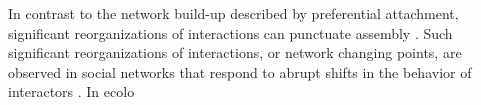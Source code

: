 \documentclass[12pt]{article}
\begin{document}
In contrast to the network build-up described by preferential
attachment, significant reorganizations of interactions can punctuate
assembly \citep{peel2014detecting}. Such significant reorganizations
of interactions, or network changing points, are observed in social
networks that respond to abrupt shifts in the behavior of interactors
\citep{peel2014detecting}. In ecolo%

\end{document}
